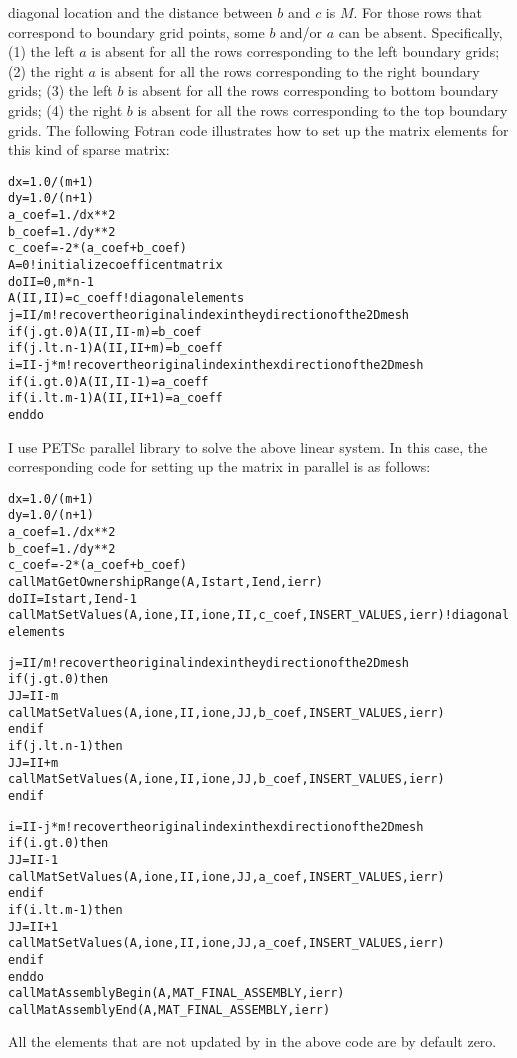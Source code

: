 \documentclass{article}
\newcommand{\tmtexttt}[1]{{\ttfamily{#1}}}
\newenvironment{tmcode}[1][]{\begin{alltt} }{\end{alltt}}
\begin{document}
diagonal location and the distance between $b$ and $c$ is $M$. For those rows
that correspond to boundary grid points, some $b$ and/or $a$ can be absent.
Specifically, (1) the left $a$ is absent for all the rows corresponding to the
left boundary grids; (2) the right $a$ is absent for all the rows
corresponding to the right boundary grids; (3) the left $b$ is absent for all
the rows corresponding to bottom boundary grids; (4) the right $b$ is absent
for all the rows corresponding to the top boundary grids. The following Fotran
code illustrates how to set up the matrix elements for this kind of sparse
matrix:
\begin{tmcode}
dx=1.0/(m+1)
dy=1.0/(n+1)
a_coef= 1./dx**2
b_coef=1./dy**2
c_coef = -2*(a_coef+b_coef)
A=0 !initialize coefficent matrix
do  II=0,m*n-1
     A(II,II)=c_coeff !diagonal elements
     j = II/m !recover the original index in the y direction of the 2D mesh
     if (j.gt.0) A(II,II-m)=b_coef
     if (j.lt.n-1) A(II,II+m)=b_coeff
     i = II - j*m !recover the original index in the x direction of the 2D mesh
     if (i.gt.0) A(II,II-1)=a_coeff
     if (i.lt.m-1) A(II,II+1)=a_coeff
enddo
\end{tmcode}
I use PETSc parallel library{\cite{petsc-web-page}} to solve the above linear
system. In this case, the corresponding code for setting up the matrix in
parallel is as follows:
\begin{tmcode}
dx=1.0/(m+1)
dy=1.0/(n+1)
a_coef= 1./dx**2
b_coef=1./dy**2
c_coef = -2*(a_coef+b_coef)
call MatGetOwnershipRange(A,Istart,Iend,ierr) 
do  II=Istart,Iend-1
     call  MatSetValues(A,ione,II,ione,II,c_coef,INSERT_VALUES,ierr) !diagonal elements

     j = II/m !recover the original index in the y direction of the 2D mesh
     if (j.gt.0) then
        JJ = II - m
        call MatSetValues(A,ione,II,ione,JJ,b_coef,INSERT_VALUES,ierr)
     endif
     if (j.lt.n-1) then
        JJ = II + m
        call MatSetValues(A,ione,II,ione,JJ,b_coef,INSERT_VALUES,ierr)
     endif
  
    i = II - j*m !recover the original index in the x direction of the 2D mesh
     if (i.gt.0) then
        JJ = II - 1
        call MatSetValues(A,ione,II,ione,JJ,a_coef,INSERT_VALUES,ierr)
     endif
     if (i.lt.m-1) then
        JJ = II + 1
        call MatSetValues(A,ione,II,ione,JJ,a_coef,INSERT_VALUES,ierr)
     endif
enddo
call MatAssemblyBegin(A,MAT_FINAL_ASSEMBLY,ierr)
call MatAssemblyEnd  (A,MAT_FINAL_ASSEMBLY,ierr)
\end{tmcode}
All the elements that are not updated by \tmtexttt{MatSetValues} in the above
code are by default zero.
\end{document}

